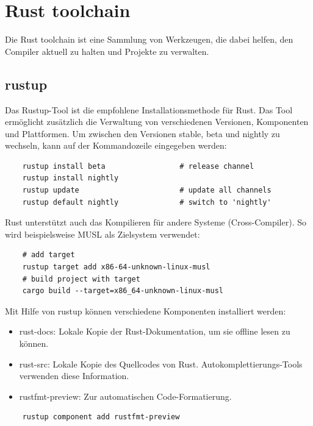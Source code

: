 \chapter{Rust toolchain}

Die Rust toolchain ist eine Sammlung von Werkzeugen, die dabei helfen, den Compiler aktuell zu halten und Projekte zu verwalten.


\section{rustup}

Das Rustup-Tool ist die empfohlene Installationsmethode für Rust. Das Tool ermöglicht zusätzlich die Verwaltung von verschiedenen Versionen, Komponenten und Platt\-for\-men. Um zwischen den Versionen stable, beta und nightly zu wechseln, kann auf der Kommandozeile eingegeben werden: \cite{RustEdition}

\begin{lstlisting}   
    rustup install beta                 # release channel
    rustup install nightly
    rustup update                       # update all channels
    rustup default nightly              # switch to 'nightly'
\end{lstlisting}

Rust unterstützt auch das Kompilieren für andere Systeme (Cross-Compiler). So wird beispielsweise MUSL als Zielsystem verwendet:

\begin{lstlisting}
    # add target
    rustup target add x86-64-unknown-linux-musl
    # build project with target
    cargo build --target=x86_64-unknown-linux-musl
\end{lstlisting}

Mit Hilfe von rustup können verschiedene Komponenten installiert werden:

\begin{itemize}
    \item rust-docs: Lokale Kopie der Rust-Dokumentation, um sie offline lesen zu können.
    \item rust-src: Lokale Kopie des Quellcodes von Rust. Autokomplettierungs-Tools verwenden diese Information.
    \item rustfmt-preview: Zur automatischen Code-Formatierung.
\end{itemize}

\begin{lstlisting}
    rustup component add rustfmt-preview
\end{lstlisting}


